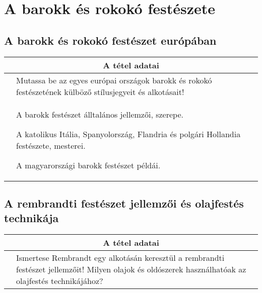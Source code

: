 \chapter{A barokk és rokokó festészete} %
\label{ch:11_barokk_es_rokoko}

\section{A barokk és rokokó festészet európában}

\begin{center}
	\begin{longtable}{ | p{} | p{} | }
		
		\hline
		\multicolumn{2}{|c|}{\textbf{A tétel adatai}}
		\\ \hline
		\hline
		
		\centering{Tétel teljes címe}
		& 
		Mutassa be az egyes európai országok barokk és rokokó festészetének külböző stílusjegyeit és alkotásait!
		\\ \hline
		
		\centering{Jegyzetek}
		&
		\begin{compactitem}
			\item A barokk festészet álltalános jellemzői, szerepe.
			\item A katolikus Itália, Spanyolország, Flandria és polgári Hollandia festészete, mesterei.
			\item A magyarországi barokk festészet példái.
		\end{compactitem}
		\\\hline
		
	\end{longtable}
\end{center}

\cleardoublepage


\section{A rembrandti festészet jellemzői és olajfestés technikája}

\begin{center}
	\begin{longtable}{ | p{} | p{} | }
		
		\hline
		\multicolumn{2}{|c|}{\textbf{A tétel adatai}}
		\\ \hline
		
		\hline
		\centering{Tétel teljes címe}
		&
		Ismertese Rembrandt egy alkotásán keresztül a rembrandti festészet jellemzőit! Milyen olajok és oldószerek használhatóak az olajfestés technikájához?
		\\ \hline
		
	\end{longtable}
\end{center}
